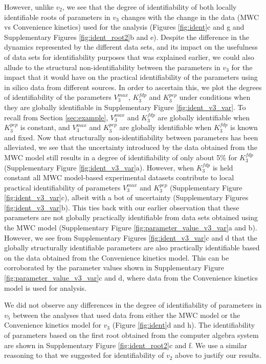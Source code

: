 \documentclass[10pt]{article}
\begin{document}
	However, unlike $v_2$, we see that the degree of identifiability of both locally identifiable roots of parameters in $v_3$ changes with the change in the data (MWC vs Convenience kinetics) used for the analysis (Figures \ref{fig:ident}c and g and Supplementary Figures \ref{fig:ident_root2}b and e). Despite the difference in the dynamics represented by the different data sets, and its impact on the usefulness of data sets for identifiability purposes that was explained earlier, we could also allude to the structural non-identifiability between the parameters in $v_3$ for the impact that it would have on the practical identifiability of the parameters using in silico data from different sources. In order to ascertain this, we plot the degrees of identifiability of the parameters $V_3^{max}$, $K_3^{fdp}$ and $K_3^{pep}$ under conditions when they are globally identifiable in Supplementary Figure \ref{fig:ident_v3_var}. To recall from Section \ref{sec:example}, $V_3^{max}$ and $K_3^{fdp}$ are globally identifiable when $K_3^{pep}$ is constant, and $V_3^{max}$ and $K_3^{pep}$ are globally identifiable when $K_3^{fdp}$ is known and fixed. Now that structurally non-identifiability between parameters has been alleviated, we see that the uncertainty introduced by the data obtained from the MWC model still results in a degree of identifiability of only about 5\% for $K_3^{fdp}$ (Supplementary Figure \ref{fig:ident_v3_var}a). However, when $K_3^{fdp}$ is held constant all MWC model-based experimental datasets contribute to local practical identifiability of parameters $V_3^{max}$ and $K_3^{pep}$ (Supplementary Figure \ref{fig:ident_v3_var}c), albeit with a bot of uncertainty (Supplementary Figures \ref{fig:ident_v3_var}b). This ties back with our earlier observation that these parameters are not globally practically identifiable from data sets obtained using the MWC model (Supplementary Figure \ref{fig:parameter_value_v3_var}a and b). However, we see from Supplementary Figures \ref{fig:ident_v3_var}c and d that the globally structurally identifiable parameters are also practically identifiable based on the data obtained from the Convenience kinetics model. This can be corroborated by the parameter values shown in Supplementary Figure \ref{fig:parameter_value_v3_var}c and d, where data from the Convenience kinetics model is used for analysis.
	
	We did not observe any differences in the degree of identifiability of parameters in $v_5$ between the analyses that used data from either the MWC model or the Convenience kinetics model for $v_3$ (Figure \ref{fig:ident}d and h). The identifiability of parameters based on the first root obtained from the computer algebra system are shown in Supplementary Figure \ref{fig:ident_root2}c and f. We use a similar reasoning to that we suggested for identifiability of $v_2$ above to justify our results.	 
	
\end{document}
